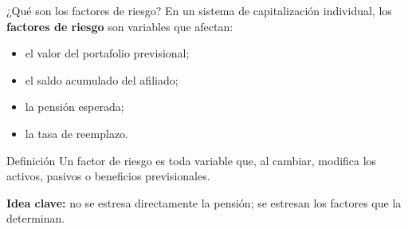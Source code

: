 \documentclass[10pt,aspectratio=169]{beamer}
\begin{document}
\begin{frame}{¿Qué son los factores de riesgo?}
En un sistema de capitalización individual, los \textbf{factores de riesgo} son variables que afectan:

\begin{itemize}
    \item el valor del portafolio previsional;
    \item el saldo acumulado del afiliado;
    \item la pensión esperada;
    \item la tasa de reemplazo.
\end{itemize}

\begin{block}{Definición}
Un factor de riesgo es toda variable que, al cambiar, modifica los activos, pasivos o beneficios previsionales.
\end{block}

\vspace{0.2cm}
\textbf{Idea clave:} no se estresa directamente la pensión; se estresan los factores que la determinan.
\end{frame}
\end{document}
